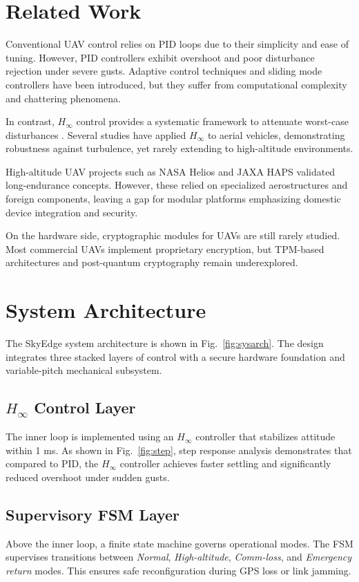 \documentclass[conference]{IEEEtran}
\begin{document}
\section{Related Work}
Conventional UAV control relies on PID loops due to their simplicity and ease of tuning. However, PID controllers exhibit overshoot and poor disturbance rejection under severe gusts. Adaptive control techniques and sliding mode controllers have been introduced, but they suffer from computational complexity and chattering phenomena.  

In contrast, $H_\infty$ control provides a systematic framework to attenuate worst-case disturbances \cite{zhou1996robust}. Several studies have applied $H_\infty$ to aerial vehicles, demonstrating robustness against turbulence, yet rarely extending to high-altitude environments.  

High-altitude UAV projects such as NASA Helios \cite{nasahelios} and JAXA HAPS \cite{jaxaHAPS} validated long-endurance concepts. However, these relied on specialized aerostructures and foreign components, leaving a gap for modular platforms emphasizing domestic device integration and security.  

On the hardware side, cryptographic modules for UAVs are still rarely studied. Most commercial UAVs implement proprietary encryption, but TPM-based architectures and post-quantum cryptography \cite{pqcrypto2022} remain underexplored.  

\section{System Architecture}
The SkyEdge system architecture is shown in Fig.~\ref{fig:sysarch}. The design integrates three stacked layers of control with a secure hardware foundation and variable-pitch mechanical subsystem.  

\subsection{$H_\infty$ Control Layer}
The inner loop is implemented using an $H_\infty$ controller that stabilizes attitude within 1 ms. As shown in Fig.~\ref{fig:step}, step response analysis demonstrates that compared to PID, the $H_\infty$ controller achieves faster settling and significantly reduced overshoot under sudden gusts.  

\subsection{Supervisory FSM Layer}
Above the inner loop, a finite state machine governs operational modes. The FSM supervises transitions between \emph{Normal}, \emph{High-altitude}, \emph{Comm-loss}, and \emph{Emergency return} modes. This ensures safe reconfiguration during GPS loss or link jamming.  
\end{document}
